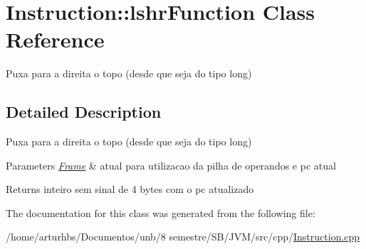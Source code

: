 \hypertarget{classInstruction_1_1lshrFunction}{}\section{Instruction\+:\+:lshr\+Function Class Reference}
\label{classInstruction_1_1lshrFunction}


Puxa para a direita o topo (desde que seja do tipo long)  




\subsection{Detailed Description}
Puxa para a direita o topo (desde que seja do tipo long) 


\begin{DoxyParams}{Parameters}
{\em \hyperlink{classFrame}{Frame}} & atual para utilizacao da pilha de operandos e pc atual \\
\hline
\end{DoxyParams}
\begin{DoxyReturn}{Returns}
inteiro sem sinal de 4 bytes com o pc atualizado 
\end{DoxyReturn}


The documentation for this class was generated from the following file\+:\begin{DoxyCompactItemize}
\item 
/home/arturhbs/\+Documentos/unb/8 semestre/\+S\+B/\+J\+V\+M/src/cpp/\hyperlink{Instruction_8cpp}{Instruction.\+cpp}\end{DoxyCompactItemize}
